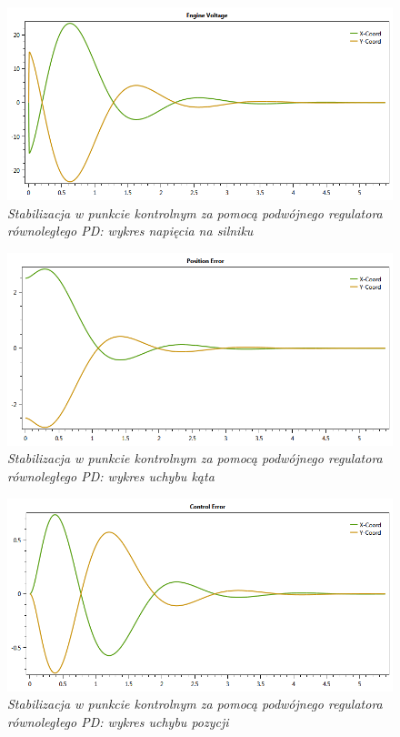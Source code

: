 \documentclass[12pt, oneside]{report}
\theoremstyle{definition}
\begin{document}
\begin{figure}[H]
	\centering
		\includegraphics[width = 320pt]{LinePDEV} 
		\caption{\textit{Stabilizacja w punkcie kontrolnym za pomocą podwójnego regulatora równoległego PD: wykres napięcia na silniku}}
		\label{plot:LinePDEV}
\end{figure}

\begin{figure}[H]
	\centering
		\includegraphics[width = 320pt]{LinePDCEP} 
		\caption{\textit{Stabilizacja w punkcie kontrolnym za pomocą podwójnego regulatora równoległego PD: wykres uchybu kąta}}
		\label{plot:LinePDCEP}
\end{figure}

\begin{figure}[H]
	\centering
		\includegraphics[width = 320pt]{LinePDCEA} 
		\caption{\textit{Stabilizacja w punkcie kontrolnym za pomocą podwójnego regulatora równoległego PD: wykres uchybu pozycji}}
		\label{plot:LinePDCEA}
\end{figure}
\end{document}
